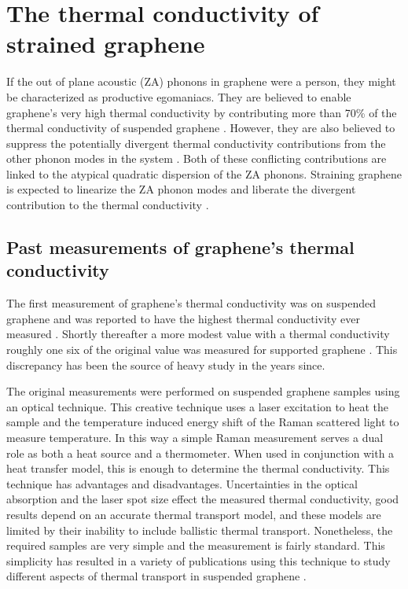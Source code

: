 \chapter{The thermal conductivity of strained graphene\label{chap:therm}}
If the out of plane acoustic (ZA) phonons in graphene were a person, they might be characterized as productive egomaniacs.
They are believed to enable graphene's very high thermal conductivity by contributing more than 70\% of the thermal conductivity of suspended graphene \cite{Lindsay2010}.
However, they are also believed to suppress the potentially divergent thermal conductivity contributions from the other phonon modes in the system \cite{Pereira2013,Bonini2012}.
Both of these conflicting contributions are linked to the atypical quadratic dispersion of the ZA phonons.
Straining graphene is expected to linearize the ZA phonon modes and liberate the divergent contribution to the thermal conductivity \cite{Pereira2013,Bonini2012}.

\section{Past measurements of graphene's thermal conductivity}
The first measurement of graphene's thermal conductivity was on suspended graphene and was reported to have the highest thermal conductivity ever measured \cite{Balandin2008}.
Shortly thereafter a more modest value with a thermal conductivity roughly one six of the original value was measured for supported graphene \cite{Seol2010}.
This discrepancy has been the source of heavy study in the years since.

The original measurements were performed on suspended graphene samples using an optical technique.
This creative technique uses a laser excitation to heat the sample and the temperature induced energy shift of the Raman scattered light to measure temperature.
In this way a simple Raman measurement serves a dual role as both a heat source and a thermometer.
When used in conjunction with a heat transfer model, this is enough to determine the thermal conductivity.
This technique has advantages and disadvantages.
Uncertainties in the optical absorption and the laser spot size effect the measured thermal conductivity, good results depend on an accurate thermal transport model, and these models are limited by their inability to include ballistic thermal transport.
Nonetheless, the required samples are very simple and the measurement is fairly standard.
This simplicity has resulted in a variety of publications using this technique to study different aspects of thermal transport in suspended graphene \cite{Balandin2008,Faugeras2010,Cai2010,Ghosh2010,Lee2011,Chen2011a,Chen2012}.

